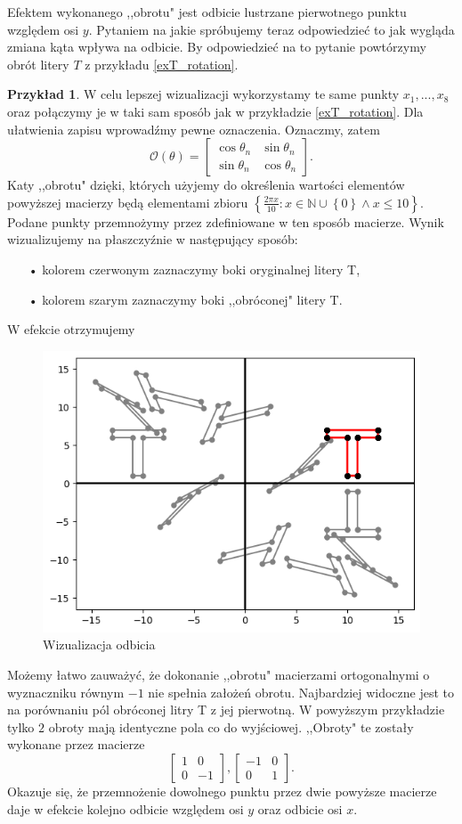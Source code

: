 \documentclass[a4paper,twoside,11pt,reqno]{mwrep}
\theoremstyle{plain} \newtheorem{twr}{Twierdzenie}
\theoremstyle{plain} \newtheorem{lem}{Lemat}
\theoremstyle{definition} \newtheorem{defi}{Definicja}
\theoremstyle{remark} \newtheorem*{wni}{Wniosek}
\theoremstyle{definition} \newtheorem{uwaga}{Uwaga}
\theoremstyle{definition}\newtheorem{prz}{Przykład}
\begin{document}
Efektem wykonanego ,,obrotu" jest odbicie lustrzane pierwotnego punktu względem osi $y$.
Pytaniem na jakie spróbujemy teraz odpowiedzieć to jak wygląda zmiana kąta wpływa na odbicie. 
By odpowiedzieć na to pytanie powtórzymy obrót litery $T$ z przykładu \ref{exT_rotation}.
\begin{prz}
W celu lepszej wizualizacji wykorzystamy te same punkty $x_1,...,x_8$ oraz połączymy je w taki sam sposób
jak w przykładzie  \ref{exT_rotation}. Dla ułatwienia zapisu wprowadźmy pewne oznaczenia. 
Oznaczmy, zatem
$$\mathcal{O}(\theta) =\begin{bmatrix}
\cos\theta_n&\sin\theta_n \\
\sin\theta_n & \cos\theta_n
\end{bmatrix}.$$
Katy ,,obrotu" dzięki, których użyjemy do określenia wartości elementów powyższej macierzy
będą elementami zbioru $\left\{\frac{2\pi x}{10}: x\in\mathbb{N}\cup\left\{ 0 \right\} \wedge x\leqslant10 \right\}$. Podane punkty przemnożymy przez zdefiniowane w ten sposób macierze.
Wynik wizualizujemy na płaszczyźnie w następujący sposób:
\begin{itemize}
\item[•] kolorem czerwonym zaznaczymy boki oryginalnej litery T,
\item[•] kolorem szarym zaznaczymy boki ,,obróconej" litery T.
\end{itemize}
W efekcie otrzymujemy  
\begin{figure}[h]
\begin{center}
\includegraphics[width=7 cm]{T-reflection.png}
\caption{Wizualizacja odbicia}
\end{center}
\end{figure}
Możemy łatwo zauważyć, że dokonanie ,,obrotu" macierzami 
ortogonalnymi o wyznaczniku równym $-1$ nie spełnia założeń obrotu. Najbardziej widoczne
jest to na porównaniu pól obróconej litry T z jej pierwotną. W powyższym przykładzie tylko 
$2$ obroty mają identyczne pola co do wyjściowej. ,,Obroty" te zostały wykonane przez macierze
$$
\begin{bmatrix}
1&0 \\
0 & -1
\end{bmatrix},
\begin{bmatrix}
-1&0 \\
0 & 1
\end{bmatrix}.$$
Okazuje się, że przemnożenie dowolnego punktu przez dwie powyższe macierze daje w efekcie kolejno
odbicie względem osi $y$ oraz odbicie osi $x$.
\end{prz}
\end{document}
